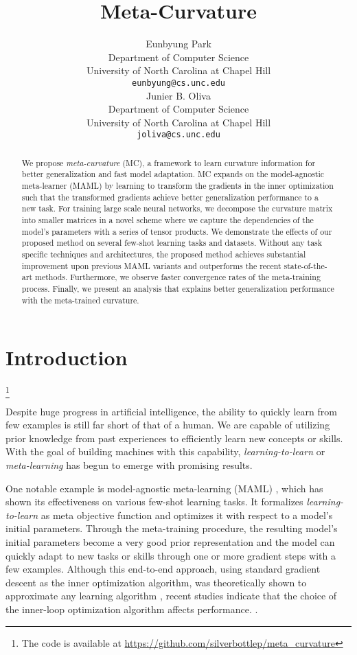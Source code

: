 \documentclass{article}
\title{Meta-Curvature}
\author{Eunbyung Park \\
  Department of Computer Science\\
  University of North Carolina at Chapel Hill \\
  \texttt{eunbyung@cs.unc.edu} \\
\And
  Junier B. Oliva \\
  Department of Computer Science \\
  University of North Carolina at Chapel Hill \\
  \texttt{joliva@cs.unc.edu} \\
}
\newcommand\blfootnote[1]{\begingroup
  \renewcommand\thefootnote{}\footnote{#1}\addtocounter{footnote}{-1}\endgroup
}
\begin{document}
\maketitle

\begin{abstract}
We propose \textit{meta-curvature} (MC), a framework to learn curvature information for better generalization and fast model adaptation. MC expands on the model-agnostic meta-learner (MAML) by learning to transform the gradients in the inner optimization such that the transformed gradients achieve better generalization performance to a new task. For training large scale neural networks, we decompose the curvature matrix into smaller matrices in a novel scheme where we capture the dependencies of the model's parameters with a series of tensor products. We demonstrate the effects of our proposed method on several few-shot learning tasks and datasets. Without any task specific techniques and architectures, the proposed method achieves substantial improvement upon previous MAML variants and outperforms the recent state-of-the-art methods. Furthermore, we observe faster convergence rates of the meta-training process. Finally, we present an analysis that explains better generalization performance with the meta-trained curvature.
\end{abstract}


\section{Introduction}
\label{introduction}
\blfootnote{The code is available at \url{https://github.com/silverbottlep/meta_curvature}} Despite huge progress in artificial intelligence, the ability to quickly learn from few examples is still far short of that of a human. We are capable of utilizing prior knowledge from past experiences to efficiently learn new concepts or skills. With the goal of building machines with this capability, \textit{learning-to-learn} or \textit{meta-learning} has begun to emerge with promising results.

One notable example is model-agnostic meta-learning (MAML) \cite{Finn-icml-2017, Nichol-arxiv-2018}, which has shown its effectiveness on various few-shot learning tasks. It formalizes \textit{learning-to-learn} as meta objective function and optimizes it with respect to a model's initial parameters. Through the meta-training procedure, the resulting model's initial parameters become a very good prior representation and the model can quickly adapt to new tasks or skills through one or more gradient steps with a few examples. Although this end-to-end approach, using standard gradient descent as the inner optimization algorithm, was theoretically shown to approximate any learning algorithm \cite{Finn-iclr-2018}, recent studies indicate that the choice of the inner-loop optimization algorithm affects performance.  \cite{Li-arxiv-2017,Antoniou-arxiv-2018,Grant-iclr-2018}.
\end{document}
